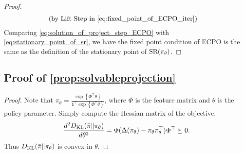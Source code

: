 \begin{proof}
\begin{equation}
\begin{split}
		\text{(by Lift Step in \cref{eq:fixed_point_of_ECPO_iter})} &
	\end{split}
	\end{equation}
	Comparing \cref{eq:solution_of_project_step_ECPO} with \cref{eq:stationary_point_of_sr}, we have the fixed point condition of ECPO is the same as the definition of the stationary point of $\text{SR}(\pi_{\theta})$.
\end{proof}

\subsection{Proof of \cref{prop:solvableprojection}}
\begin{proof}
	Note that $\pi_{\theta} = \frac{\exp\left\{\Phi^\top\theta\right\}}{{\mathbf{1}^\top \exp\left\{\Phi^\top\theta\right\} }}$, where $\Phi$ is the feature matrix and $\theta$ is the policy parameter.
	Simply compute the Hessian matrix of the objective,
	 \[\frac{d^2 D_{\mathrm{KL}}(\bar{\pi} \| \pi_{\theta})}{d \theta^2} = \Phi (\Delta(\pi_\theta) - \pi_\theta \pi_\theta^\top) \Phi^\top \succeq 0.
	 \]
	 Thus $D_{\mathrm{KL}}(\bar{\pi} \| \pi_{\theta})$ is convex in $\theta$.
\end{proof}

